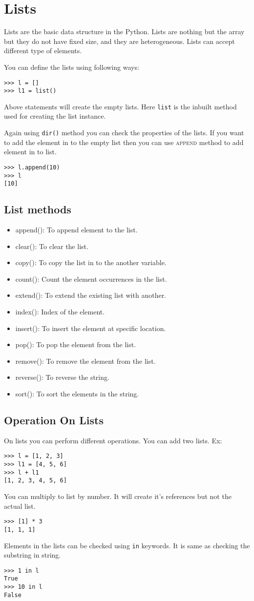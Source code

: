 \documentclass[letterpaper,12pt]{book}
\begin{document}
\section{Lists}
Lists are the basic data structure in the Python. Lists are nothing but the array but they do not have fixed size, and they are heterogeneous. Lists can accept different type of elements.

You can define the lists using following ways:
\begin{lstlisting}
>>> l = []
>>> l1 = list()
\end{lstlisting}
Above statements will create the empty lists. Here \texttt{list} is the inbuilt method used for creating the list instance.

Again using \texttt{dir()} method you can check the properties of the lists.
If you want to add the element in to the empty list then you can use \textsc{append} method to add element in to list.
\begin{lstlisting}
>>> l.append(10)
>>> l
[10]
\end{lstlisting}
\subsection{List methods}
\begin{itemize}
\item append(): To append element to the list.
\item clear(): To clear the list.
\item copy(): To copy the list in to the another variable.
\item count(): Count the element occurrences in the list.
\item extend(): To extend the existing list with another.
\item index(): Index of the element.
\item insert(): To insert the element at specific location.
\item pop(): To pop the element from the list.
\item remove(): To remove the element from the list.
\item reverse(): To reverse the string.
\item sort(): To sort the elements in the string.
\end{itemize}

\subsection{Operation On Lists}
On lists you can perform different operations. You can add two lists. Ex:
\begin{lstlisting}
>>> l = [1, 2, 3]
>>> l1 = [4, 5, 6]
>>> l + l1
[1, 2, 3, 4, 5, 6]
\end{lstlisting}
You can multiply to list by number. It will create it's references but not the actual list.
\begin{lstlisting}
>>> [1] * 3
[1, 1, 1]
\end{lstlisting}
Elements in the lists can be checked using \texttt{in} keywords. It is same as checking the substring in string.
\begin{lstlisting}
>>> 1 in l
True
>>> 10 in l
False
\end{lstlisting}
\end{document}
